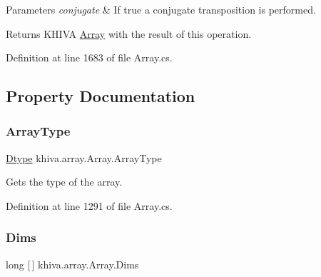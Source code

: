 \begin{DoxyParams}{Parameters}
{\em conjugate} & If true a conjugate transposition is performed.\\
\hline
\end{DoxyParams}
\begin{DoxyReturn}{Returns}
K\+H\+I\+VA \mbox{\hyperlink{classkhiva_1_1array_1_1_array}{Array}} with the result of this operation.
\end{DoxyReturn}


Definition at line 1683 of file Array.\+cs.



\subsection{Property Documentation}
\mbox{\label{classkhiva_1_1array_1_1_array_addb89dab0c05f4d0b3157a948702b47d}} 
\subsubsection{\texorpdfstring{Array\+Type}{ArrayType}}
{\footnotesize\ttfamily \mbox{\hyperlink{classkhiva_1_1array_1_1_array_a6bc9c0c6ade06a8675643de4880a116c}{Dtype}} khiva.\+array.\+Array.\+Array\+Type\hspace{0.3cm}{\ttfamily [get]}}



Gets the type of the array. 



Definition at line 1291 of file Array.\+cs.

\mbox{\label{classkhiva_1_1array_1_1_array_affdbea2ed2a063b156b6289d44591505}} 
\subsubsection{\texorpdfstring{Dims}{Dims}}
{\footnotesize\ttfamily long \mbox{[}$\,$\mbox{]} khiva.\+array.\+Array.\+Dims\hspace{0.3cm}{\ttfamily [get]}}



